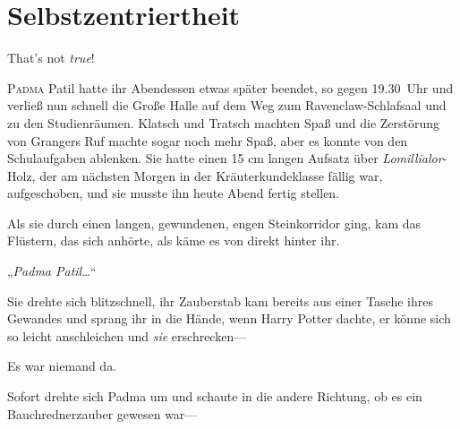 \chapter{Selbstzentriertheit}

That’s not \emph{true}!

\lettrine{P}{adma} Patil hatte ihr Abendessen etwas später beendet, so gegen 19.30~Uhr und verließ nun schnell die Große Halle auf dem Weg zum Ravenclaw-Schlafsaal und zu den Studienräumen. Klatsch und Tratsch machten Spaß und die Zerstörung von Grangers Ruf machte sogar noch mehr Spaß, aber es konnte von den Schulaufgaben ablenken. Sie hatte einen 15 cm langen Aufsatz über \emph{Lomillialor}-Holz, der am nächsten Morgen in der Kräuterkundeklasse fällig war, aufgeschoben, und sie musste ihn heute Abend fertig stellen.

Als sie durch einen langen, gewundenen, engen Steinkorridor ging, kam das Flüstern, das sich anhörte, als käme es von direkt hinter ihr.

„\emph{Padma Patil…}“

Sie drehte sich blitzschnell, ihr Zauberstab kam bereits aus einer Tasche ihres Gewandes und sprang ihr in die Hände, wenn Harry Potter dachte, er könne sich so leicht anschleichen und \emph{sie} erschrecken—

Es war niemand da.

Sofort drehte sich Padma um und schaute in die andere Richtung, ob es ein Bauchrednerzauber gewesen war—

